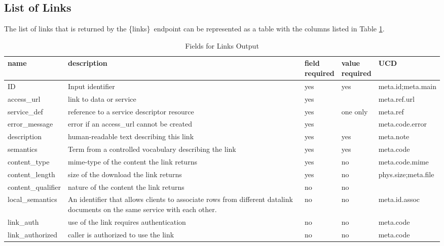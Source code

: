 \documentclass[11pt,a4paper]{ivoa}
\newcommand{\blinks}{\{links\}}
\begin{document}
\subsection{List of Links}
\label{sec:listOfLinks}

The list of links that is returned by the \blinks\ endpoint can be
represented as a table with the columns listed in Table \ref{fig:linkFields}. 
\begin{table}[h]
\begin{center}
\begin{tabular}{|l|p{}|p{}|p{}|l|}
\hline
{\bf name}      & {\bf description} & {\bf field \newline required}
                & {\bf value \newline required} & {\bf UCD} \\
\hline
ID              & Input identifier & yes & yes & meta.id;meta.main \\
\hline
access\_url     & link to data or service 
                & yes &          & meta.ref.url \\
\cline{1-3} \cline{5-5}
service\_def    & reference to a service descriptor resource
                & yes & one only & meta.ref \\
\cline{1-3} \cline{5-5}
error\_message  & error if an access\_url cannot be created
                & yes &          & meta.code.error \\
\hline
description     & human-readable text describing this link
                & yes & yes & meta.note \\
\hline
semantics       & Term from a controlled vocabulary describing the link
                & yes & yes & meta.code \\
\hline
content\_type   & mime-type of the content the link returns
                & yes & no & meta.code.mime \\
\hline
content\_length & size of the download the link returns
                & yes & no & phys.size;meta.file \\
\hline
content\_qualifier & nature of the content the link returns
                & no & no & \\
\hline
local\_semantics &   An identifier that allows clients to associate rows from
  different datalink documents on the same service with each other.
                & no & no & meta.id.assoc \\
\hline
link\_auth       & use of the link requires authentication
                 & no & no & meta.code \\
\hline
link\_authorized & caller is authorized to use the link
                 & no & no & meta.code \\
\hline
\end{tabular}
\end{center}
\caption{Fields for Links Output}
\label{fig:linkFields}
\end{table}
\end{document}
